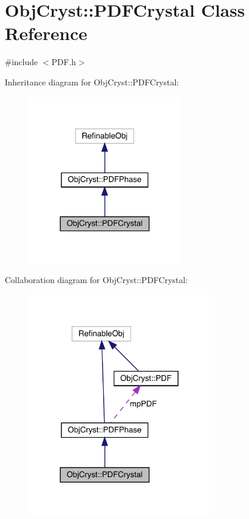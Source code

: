 \hypertarget{class_obj_cryst_1_1_p_d_f_crystal}{}\section{Obj\+Cryst\+::P\+D\+F\+Crystal Class Reference}
\label{class_obj_cryst_1_1_p_d_f_crystal}


{\ttfamily \#include $<$P\+D\+F.\+h$>$}



Inheritance diagram for Obj\+Cryst\+::P\+D\+F\+Crystal\+:
\nopagebreak
\begin{figure}[H]
\begin{center}
\leavevmode
\includegraphics[width=192pt]{class_obj_cryst_1_1_p_d_f_crystal__inherit__graph}
\end{center}
\end{figure}


Collaboration diagram for Obj\+Cryst\+::P\+D\+F\+Crystal\+:
\nopagebreak
\begin{figure}[H]
\begin{center}
\leavevmode
\includegraphics[width=228pt]{class_obj_cryst_1_1_p_d_f_crystal__coll__graph}
\end{center}
\end{figure}
